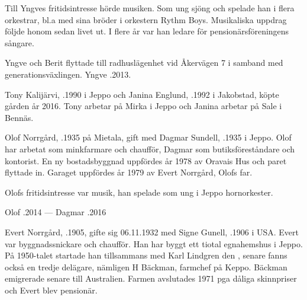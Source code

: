 Till Yngves fritidsintresse hörde musiken. Som ung sjöng och spelade han i flera orkestrar, bl.a med sina bröder i orkestern Rythm Boys. Musikaliska uppdrag följde honom sedan livet ut. I flere år var han ledare för pensionärsföreningens sångare.

Yngve och Berit flyttade till radhuslägenhet vid Åkervägen 7 i samband med generationsväxlingen. Yngve .2013.






Tony Kalijärvi, .1990 i Jeppo och Janina Englund, .1992 i Jakobstad, köpte gården år 2016. Tony arbetar på Mirka i Jeppo och Janina arbetar på Sale i Bennäs.


Olof Norrgård, .1935 på Mietala, gift med Dagmar Sundell, .1935  i Jeppo. Olof har arbetat som minkfarmare och chaufför, Dagmar som butiksföreståndare och kontorist. En ny bostadsbyggnad uppfördes år 1978 av Oravais Hus och paret flyttade in. Garaget uppfördes år 1979 av Evert Norrgård, Olofs far.

Olofs fritidsintresse var musik, han spelade som ung i Jeppo hornorkester.

Olof .2014  ---  Dagmar .2016






Evert Norrgård, .1905, gifte sig 06.11.1932 med Signe Gunell, .1906 i USA. Evert var byggnadssnickare och chaufför. Han har byggt ett tiotal egnahemshus i Jeppo. På 1950-talet startade han tillsammans med Karl Lindgren den , senare fanns också en tredje delägare, nämligen H Bäckman, farmchef på Keppo. Bäckman emigrerade senare till Australien. Farmen avslutades 1971 pga dåliga skinnpriser och Evert blev pensionär.

